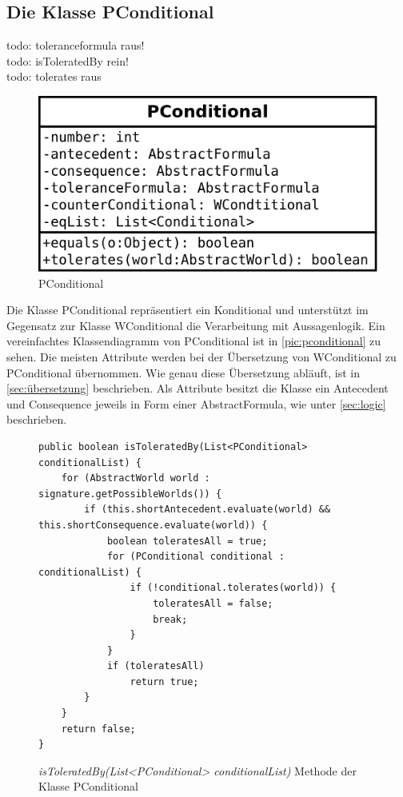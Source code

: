\documentclass[12pt,a4paper]{article}
\begin{document}
\subsection{Die Klasse PConditional}
\label{sec:pconditional}
todo: toleranceformula raus!\\
todo: isToleratedBy rein! \\
todo: tolerates raus \\
\begin{figure}
\includegraphics[width=0.45\linewidth]{bilder/PConditional.png}
\caption{PConditional}
\label{pic:pconditional}
\end{figure}


Die Klasse PConditional repräsentiert ein Konditional und unterstützt im Gegensatz zur Klasse WConditional die Verarbeitung mit Aussagenlogik. Ein vereinfachtes Klassendiagramm von PConditional ist in \autoref{pic:pconditional} zu sehen. Die meisten Attribute werden bei der Übersetzung von WConditional zu PConditional übernommen. Wie genau diese Übersetzung abläuft, ist in \autoref{sec:übersetzung} beschrieben. Als Attribute besitzt die Klasse ein Antecedent und Consequence jeweils in Form einer AbstractFormula, wie unter \autoref{sec:logic} beschrieben. 


\begin{figure}
\begin{lstlisting}
public boolean isToleratedBy(List<PConditional> conditionalList) {
    for (AbstractWorld world : signature.getPossibleWorlds()) {
        if (this.shortAntecedent.evaluate(world) && this.shortConsequence.evaluate(world)) {
            boolean toleratesAll = true;
            for (PConditional conditional : conditionalList) {
                if (!conditional.tolerates(world)) {
                    toleratesAll = false;
                    break;
                }
            }
            if (toleratesAll)
                return true;
        }
    }
    return false;
}
\end{lstlisting}
\caption{\textit{isToleratedBy(List<PConditional> conditionalList)} Methode der Klasse PConditional}
\label{code:conditional-istoleratedby}
\end{figure}
\end{document}
